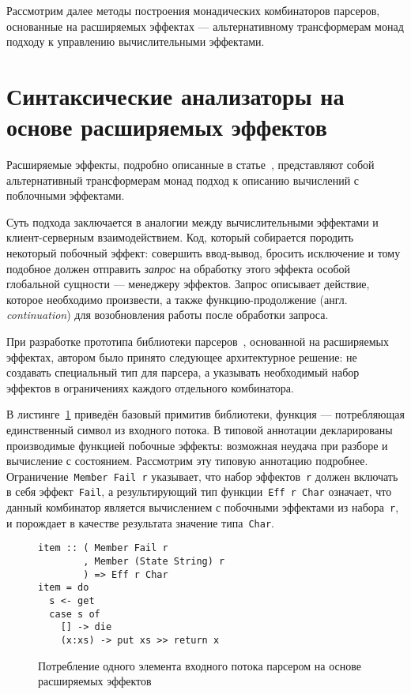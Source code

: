   Рассмотрим далее методы построения монадических комбинаторов парсеров, основанные
  на расширяемых эффектах --- альтернативному трансформерам монад подходу к управлению
  вычислительными эффектами.  

\section{Синтаксические анализаторы на основе расширяемых эффектов}

  Расширяемые эффекты, подробно описанные в статье~\cite{extEffects}, представляют
  собой альтернативный трансформерам монад подход к описанию вычислений с поблочными
  эффектами.

  Суть подхода заключается в аналогии между вычислительными эффектами и
  клиент-серверным взаимодействием. Код, который собирается породить некоторый
  побочный эффект: совершить ввод-вывод, бросить исключение и тому подобное должен
  отправить \emph{запрос} на обработку этого эффекта особой глобальной сущности
  --- менеджеру эффектов. Запрос описывает действие, которое необходимо
  произвести, а также функцию-продолжение (англ. \emph{continuation}) для
  возобновления работы после обработки запроса.

  При разработке прототипа библиотеки парсеров~\cite{extEffParsers}, основанной на расширяемых 
  эффектах, автором было принято следующее архитектурное решение: 
  не создавать специальный тип для парсера, а указывать необходимый набор эффектов 
  в ограничениях каждого отдельного комбинатора.

  В листинге~\ref{listing:extEffItem} приведён базовый примитив библиотеки, 
  функция --- потребляющая единственный символ из входного потока. 
  В типовой аннотации декларированы
  производимые функцией побочные эффекты: возможная неудача при разборе и 
  вычисление с состоянием. Рассмотрим эту типовую аннотацию подробнее. 
  Ограничение~\lstinline{Member Fail r} указывает, что набор 
  эффектов~\lstinline{r} должен включать в себя эффект~\lstinline{Fail}, а 
  результирующий тип функции~\lstinline{Eff r Char} означает, что данный 
  комбинатор является вычислением с побочными эффектами из набора~\lstinline{r},
  и порождает в качестве результата значение типа~\lstinline{Char}. 

  \begin{figure}[h]
  \begin{lstlisting}
item :: ( Member Fail r
        , Member (State String) r
        ) => Eff r Char
item = do
  s <- get
  case s of 
    [] -> die
    (x:xs) -> put xs >> return x 
  \end{lstlisting}
  \caption{Потребление одного элемента входного потока парсером на основе 
  расширяемых эффектов}
  \label{listing:extEffItem}
  \end{figure} 


